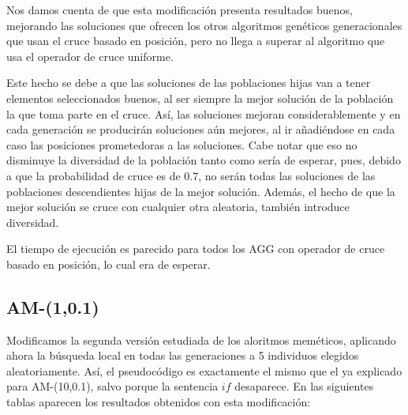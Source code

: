\documentclass[10pt,a4paper]{article}
\begin{document}
Nos damos cuenta de que esta modificación presenta resultados buenos, mejorando las soluciones que ofrecen los otros algoritmos genéticos generacionales que usan el cruce basado en posición, pero no llega a superar al algoritmo que usa el operador de cruce uniforme. 

Este hecho se debe a que las soluciones de las poblaciones hijas van a tener elementos seleccionados buenos, al ser siempre la mejor solución de la población la que toma parte en el cruce. Así, las soluciones mejoran considerablemente y en cada generación se producirán soluciones aún mejores, al ir añadiéndose en cada caso las posiciones prometedoras a las soluciones. Cabe notar que eso no disminuye la diversidad de la población tanto como sería de esperar, pues, debido a que la probabilidad de cruce es de 0.7, no serán todas las soluciones de las poblaciones descendientes hijas de la mejor solución. Además, el hecho de que la mejor solución se cruce con cualquier otra aleatoria, también introduce diversidad. 

El tiempo de ejecución es parecido para todos los AGG con operador de cruce basado en posición, lo cual era de esperar.  


\subsection{AM-(1,0.1)}

Modificamos la segunda versión estudiada de los aloritmos meméticos, aplicando ahora la búsqueda local en todas las generaciones a 5 individuos elegidos aleatoriamente. Así, el pseudocódigo es exactamente el mismo que el ya explicado para AM-(10,0.1), salvo porque la sentencia $ if $ desaparece. En las siguientes tablas aparecen los resultados obtenidos con esta modificación:
\end{document}
